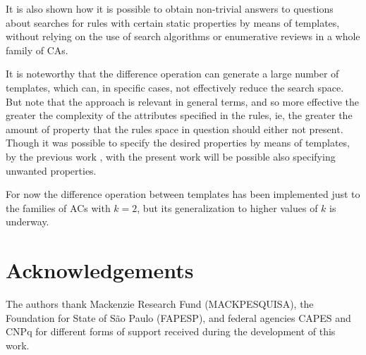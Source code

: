 \documentclass{llncs}
\begin{document}
It is also shown how it is possible to obtain non-trivial answers to questions about searches for rules with certain static properties by means of templates, without relying on the use of search algorithms or enumerative reviews in a whole family of CAs.

It is noteworthy that the difference operation can generate a large number of templates, which can, in specific cases, not effectively reduce the search space. But note that the approach is relevant in general terms, and so more effective the greater the complexity of the attributes specified in the rules, ie, the greater the amount of property that the rules space in question should either not present. Though it was possible to specify the desired properties by means of templates, by the previous work \cite{deOliveira2014,deOliveira2014b}, with the present work will be possible also specifying unwanted properties.

For now the difference operation between templates has been implemented just to the families of ACs with $k=2$, but its generalization to higher values of $k$ is underway.

\section*{Acknowledgements}
\label{sec:agrdecimentos}
The authors thank Mackenzie Research Fund (MACKPESQUISA), the Foundation for State of São Paulo (FAPESP), and federal agencies CAPES and CNPq for different forms of support received during the development of this work.
\end{document}
